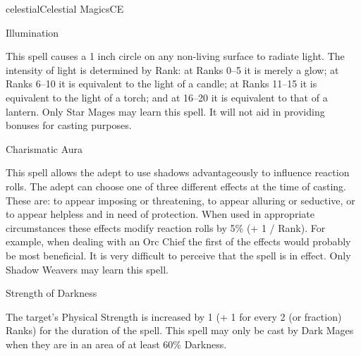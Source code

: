 \begin{College}[1.3]{celestial}{Celestial Magics}{CE}
\begin{spell}[G-9 Star]{Illumination}

\begin{effects}
This spell causes a 1 inch circle on any non-living surface to radiate
light. The intensity of light is determined by Rank: at Ranks 0–5 it
is merely a glow; at Ranks 6–10 it is equivalent to the light of a
candle; at Ranks 11–15 it is equivalent to the light of a torch; and
at 16–20 it is equivalent to that of a lantern.  Only Star Mages may
learn this spell.  It will not aid in providing bonuses for casting
purposes.
\end{effects}
\end{spell}

\begin{spell}[G-9 Shadow]{Charismatic Aura}

\begin{effects}
This spell allows the adept to use shadows advantageously to influence
reaction rolls.  The adept can choose one of three different effects
at the time of casting.  These are: to appear imposing or threatening,
to appear alluring or seductive, or to appear helpless and in need of
protection.  When used in appropriate circumstances these effects
modify reaction rolls by 5\% (+ 1 / Rank).  For example, when dealing
with an Orc Chief the first of the effects would probably be most
beneficial. It is very difficult to perceive that the spell is in
effect.  Only Shadow Weavers may learn this spell.
\end{effects}
\end{spell}


\begin{spell}[G-9 Dark]{Strength of Darkness}

\begin{effects}
The target’s Physical Strength is increased by 1 (+ 1 for every 2 (or
fraction) Ranks) for the duration of the spell.  This spell may only
be cast by Dark Mages when they are in an area of at least 60\%
Darkness.
\end{effects}
\end{spell}



\end{College}
